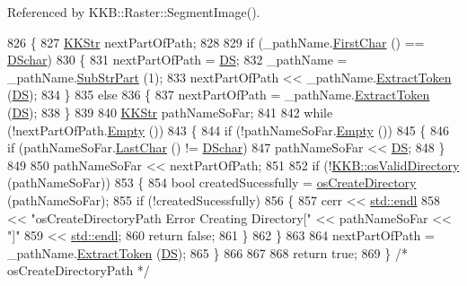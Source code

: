 Referenced by K\+K\+B\+::\+Raster\+::\+Segment\+Image().


\begin{DoxyCode}
826 \{
827   \hyperlink{class_k_k_b_1_1_k_k_str}{KKStr}  nextPartOfPath;
828 
829   \textcolor{keywordflow}{if}  (\_pathName.\hyperlink{class_k_k_b_1_1_k_k_str_ac20e69c629b985c6569af914d9cc3e8c}{FirstChar} () == \hyperlink{_o_sservices_8h_a29059d292084a3fa6111cd5ea6cac1d9}{DSchar})
830   \{
831     nextPartOfPath = \hyperlink{_o_sservices_8h_a343a817759efae73463660b09a2a898f}{DS};
832     \_pathName = \_pathName.\hyperlink{class_k_k_b_1_1_k_k_str_a5f20b2ddfc9f07c8ef99592810332ddb}{SubStrPart} (1);
833     nextPartOfPath << \_pathName.\hyperlink{class_k_k_b_1_1_k_k_str_acc31c95308d6d699debde883c11e5802}{ExtractToken} (\hyperlink{_o_sservices_8h_a343a817759efae73463660b09a2a898f}{DS});
834   \}
835   \textcolor{keywordflow}{else}
836   \{
837     nextPartOfPath = \_pathName.\hyperlink{class_k_k_b_1_1_k_k_str_acc31c95308d6d699debde883c11e5802}{ExtractToken} (\hyperlink{_o_sservices_8h_a343a817759efae73463660b09a2a898f}{DS});
838   \}
839 
840   \hyperlink{class_k_k_b_1_1_k_k_str}{KKStr}  pathNameSoFar;
841 
842   \textcolor{keywordflow}{while}  (!nextPartOfPath.\hyperlink{class_k_k_b_1_1_k_k_str_ac69942f73fffd672ec2a6e1c410afdb6}{Empty} ())
843   \{
844     \textcolor{keywordflow}{if}  (!pathNameSoFar.\hyperlink{class_k_k_b_1_1_k_k_str_ac69942f73fffd672ec2a6e1c410afdb6}{Empty} ())
845     \{
846       \textcolor{keywordflow}{if}  (pathNameSoFar.\hyperlink{class_k_k_b_1_1_k_k_str_ad1951ace757c18c2d01df666b3a4032c}{LastChar} () != \hyperlink{_o_sservices_8h_a29059d292084a3fa6111cd5ea6cac1d9}{DSchar})
847         pathNameSoFar << \hyperlink{_o_sservices_8h_a343a817759efae73463660b09a2a898f}{DS};
848     \}
849 
850     pathNameSoFar << nextPartOfPath;
851 
852     \textcolor{keywordflow}{if}  (!\hyperlink{namespace_k_k_b_a680994cc3187d4d7aa28c536ba8a3a88}{KKB::osValidDirectory} (pathNameSoFar))
853     \{
854       \textcolor{keywordtype}{bool}  createdSucessfully = \hyperlink{namespace_k_k_b_a2a7789149e2db5796fd7fdf6566db21e}{osCreateDirectory} (pathNameSoFar);
855       \textcolor{keywordflow}{if}  (!createdSucessfully)
856       \{
857         cerr << \hyperlink{namespace_k_k_b_ad1f50f65af6adc8fa9e6f62d007818a8}{std::endl} 
858              << \textcolor{stringliteral}{"osCreateDirectoryPath   Error Creating Directory["} << pathNameSoFar << \textcolor{stringliteral}{"]"}
859              << \hyperlink{namespace_k_k_b_ad1f50f65af6adc8fa9e6f62d007818a8}{std::endl};
860         \textcolor{keywordflow}{return}  \textcolor{keyword}{false};
861       \}
862     \}
863 
864     nextPartOfPath = \_pathName.\hyperlink{class_k_k_b_1_1_k_k_str_acc31c95308d6d699debde883c11e5802}{ExtractToken} (\hyperlink{_o_sservices_8h_a343a817759efae73463660b09a2a898f}{DS});
865   \}
866 
867 
868   \textcolor{keywordflow}{return}  \textcolor{keyword}{true};
869 \}  \textcolor{comment}{/* osCreateDirectoryPath */}
\end{DoxyCode}
